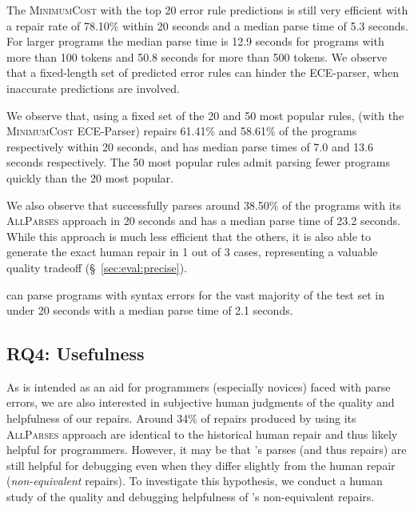 The \textsc{MinimumCost} with the top 20 error rule predictions is still very
efficient with a repair rate of 78.10\% within 20 seconds and a median parse
time of 5.3 seconds. For larger programs the median parse time is 12.9 seconds
for programs with more than 100 tokens and 50.8 seconds for more than 500
tokens. We observe that a fixed-length set of predicted error rules can hinder
the ECE-parser, when inaccurate predictions are involved.

We observe that, using a fixed set of the 20 and 50 most popular rules,
\toolname (with the \textsc{MinimumCost} ECE-Parser) repairs 61.41\% and 58.61\%
of the programs respectively within 20 seconds, and has median parse times of
7.0 and 13.6 seconds respectively. The 50 most popular rules admit parsing fewer
programs quickly than the 20 most popular.

We also observe that \toolname successfully parses around 38.50\% of the
programs with its \textsc{AllParses} approach in 20 seconds and has a median
parse time of 23.2 seconds. While this approach is much less efficient that the
others, it is also able to generate the exact human repair in 1 out of 3
cases, representing a valuable quality tradeoff (\S~\ref{sec:eval:precise}).

\begin{framed}
  \noindent \toolname can parse programs with syntax errors for the vast
  majority of the test set in under 20 seconds with a median parse time of 2.1
  seconds.
\end{framed}

\subsection{RQ4: Usefulness}
\label{sec:eval:useful}


As \toolname is intended as an aid for programmers (especially novices) faced
with parse errors, we are also interested in subjective human judgments of the
quality and helpfulness of our repairs. Around 34\% of repairs produced by
\toolname using its \textsc{AllParses} approach are identical to the historical
human repair and thus likely helpful for programmers. However, it may be that
\toolname's parses (and thus repairs) are still helpful for debugging even when
they differ slightly from the human repair (\ie \textit{non-equivalent}
repairs). To investigate this hypothesis, we conduct a human study of the
quality and debugging helpfulness of \toolname's non-equivalent repairs.

